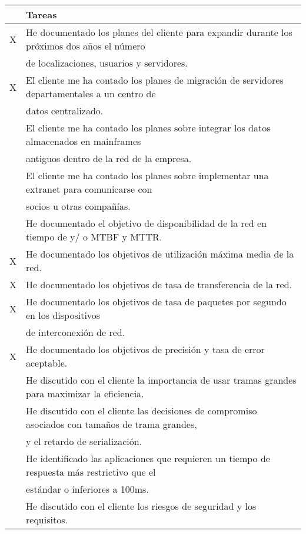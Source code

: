 \begin{table}[H]
	\begin{center}
		\begin{tabular}{|c|l|}
			\hline 
			& Tareas  \\ 
			\hline \hline
			X & He documentado los planes del cliente para expandir durante los
			próximos dos años el número \\
			& de localizaciones, usuarios y servidores.  \\ \hline
			X & El cliente me ha contado los planes de migración de servidores
			departamentales a un centro de \\
			& datos centralizado.  \\ \hline
			& El cliente me ha contado los planes sobre integrar los datos
			almacenados en mainframes \\
			& antiguos dentro de la red de la empresa.  \\ \hline
			& El cliente me ha contado los planes sobre implementar una extranet
			para comunicarse con \\
			& socios u otras compañías.  \\ \hline
		    & He documentado el objetivo de disponibilidad de la red en tiempo de y/
			o MTBF y MTTR.  \\ \hline
			X & He documentado los objetivos de utilización máxima media de la red.  \\ \hline
			X & He documentado los objetivos de tasa de transferencia de la red.  \\ \hline
			X & He documentado los objetivos de tasa de paquetes por segundo en los
			dispositivos \\
			& de interconexión de red.  \\ \hline
			X & He documentado los objetivos de precisión y tasa de error aceptable.  \\ \hline
			& He discutido con el cliente la importancia de usar tramas grandes para
			maximizar la eficiencia.  \\ \hline
			& He discutido con el cliente las decisiones de compromiso asociados
			con tamaños de trama grandes, \\
			& y el retardo de serialización.  \\ \hline
			 & He identificado las aplicaciones que requieren un tiempo de respuesta
			más restrictivo que el \\
			& estándar o inferiores a 100ms.  \\ \hline
			 & He discutido con el cliente los riesgos de seguridad y los requisitos.  \\ \hline

\end{tabular}
\end{center}
\end{table}
